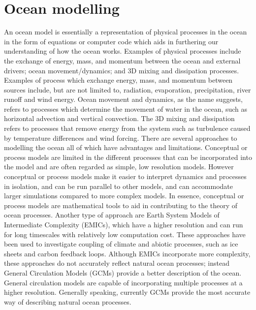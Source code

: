 \documentclass[
]{article}
\begin{document}
\hypertarget{ocean-modelling}{%
\section{Ocean modelling}\label{ocean-modelling}}

An ocean model is essentially a representation of physical processes in
the ocean in the form of equations or computer code which aids in
furthering our understanding of how the ocean works. Examples of
physical processes include the exchange of energy, mass, and momentum
between the ocean and external drivers; ocean movement/dynamics; and 3D
mixing and dissipation processes. Examples of process which exchange
energy, mass, and momentum between sources include, but are not limited
to, radiation, evaporation, precipitation, river runoff and wind energy.
Ocean movement and dynamics, as the name suggests, refers to processes
which determine the movement of water in the ocean, such as horizontal
advection and vertical convection. The 3D mixing and dissipation refers
to processes that remove energy from the system such as turbulence
caused by temperature differences and wind forcing. There are several
approaches to modelling the ocean all of which have advantages and
limitations. Conceptual or process models are limited in the different
processes that can be incorporated into the model and are often regarded
as simple, low resolution models. However conceptual or process models
make it easier to interpret dynamics and processes in isolation, and can
be run parallel to other models, and can accommodate larger simulations
compared to more complex models. In essence, conceptual or process
models are mathematical tools to aid in contributing to the theory of
ocean processes. Another type of approach are Earth System Models of
Intermediate Complexity (EMICs), which have a higher resolution and can
run for long timescales with relatively low computation cost. These
approaches have been used to investigate coupling of climate and abiotic
processes, such as ice sheets and carbon feedback loops. Although EMICs
incorporate more complexity, these approaches do not accurately reflect
natural ocean processes; instead General Circulation Models (GCMs)
provide a better description of the ocean. General circulation models
are capable of incorporating multiple processes at a higher resolution.
Generally speaking, currently GCMs provide the most accurate way of
describing natural ocean processes.
\end{document}
